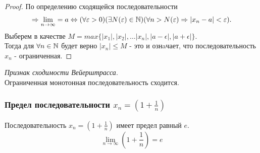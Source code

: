 \begin{proof}
  По определению сходящейся последовательности 
  \begin{gather*}
    \implies \lim_{n \to \infty} = a \iff (\forall \epsilon > 0)(\exists N(\epsilon)\in \N)(\forall n > N(\epsilon) \implies |x_{n} - a| < \epsilon).
  \end{gather*}
  Выберем в качестве $M = max \{|x_{1}|, |x_2|, \ldots |x_n|, |a - \epsilon|, |a + \epsilon|\}$. \\
Тогда для $\forall n \in \mathbb{N}$ будет верно $|x_{n}| \le M$ - это и ознaчает, что последовательность $x_{n}$ - ограниченная.
\end{proof}

\begin{theorem}
  \textit{Признак сходимости Вейерштрасса}. \\
  Ограниченная монотонная последовательность сходится.
\end{theorem}

\subsubsection{Предел последовательности $x_{n} = \left( 1 + \frac{1}{n} \right)$}

\begin{theorem}
  Последовательность $x_{n} = \left( 1 + \frac{1}{n} \right) $ имеет предел равный $e$.
  \[
  \lim_{n \to \infty} \left( 1 + \frac{1}{n} \right) = e 
  \] 
\end{theorem}
